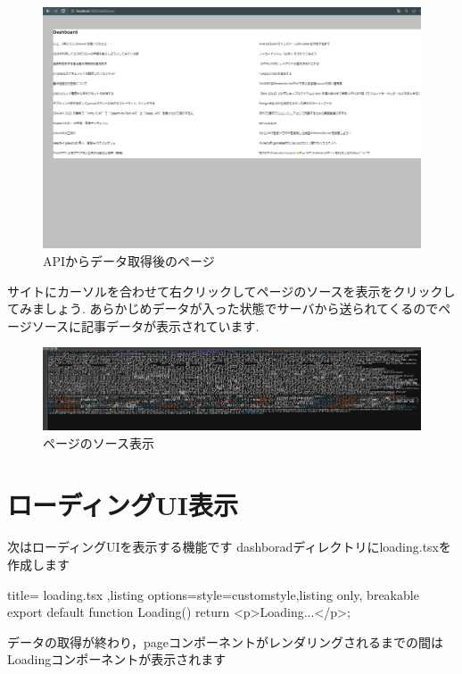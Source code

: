 \begin{figure}[H]
  \centering
  \includegraphics[width=12cm]{./image/03-Tech/chap4/06.png}
  \caption{APIからデータ取得後のページ}
\end{figure}


サイトにカーソルを合わせて右クリックしてページのソースを表示をクリックしてみましょう.
あらかじめデータが入った状態でサーバから送られてくるのでページソースに記事データが表示されています.

\begin{figure}[H]
  \centering
  \includegraphics[width=12cm]{./image/03-Tech/chap4/05.png}
  \caption{ページのソース表示}
\end{figure}

\section{ローディングUI表示}

次はローディングUIを表示する機能です
dashboradディレクトリにloading.tsxを作成します

\begin{tcblisting}{title={
        loading.tsx
      },listing options={style=customstyle},listing only, breakable}
  export default function Loading() {
    return <p>Loading...</p>;
  }
\end{tcblisting}


データの取得が終わり，pageコンポーネントがレンダリングされるまでの間はLoadingコンポーネントが表示されます

